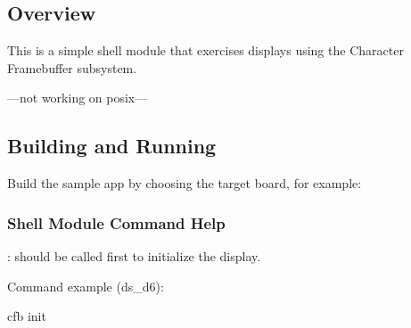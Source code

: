 \documentclass[letterpaper,10pt,english]{sphinxmanual}
\begin{document}
\subsection{Overview}
\label{\detokenize{samples/samplescfb_shellREADME:overview}}
This is a simple shell module that exercises displays using the Character
Framebuffer subsystem.

—not working on posix—\textendash{}


\subsection{Building and Running}
\label{\detokenize{samples/samplescfb_shellREADME:building-and-running}}
Build the sample app by choosing the target board, for example:


\subsubsection{Shell Module Command Help}
\label{\detokenize{samples/samplescfb_shellREADME:shell-module-command-help}}
\begin{sphinxVerbatim}[commandchars=\\\{\}]
\end{sphinxVerbatim}

: should be called first to initialize the display.

Command example (ds\_d6):

\begin{sphinxVerbatim}[commandchars=\\\{\}]
 cfb init
\end{sphinxVerbatim}
\end{document}
